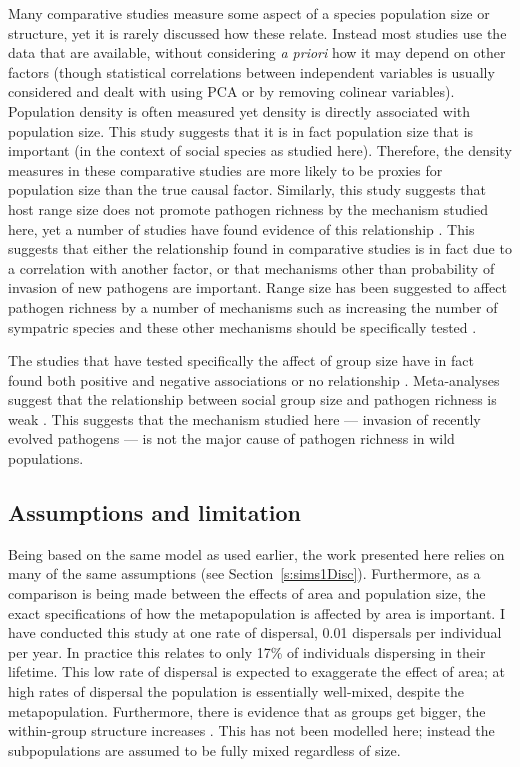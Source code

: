 Many comparative studies measure some aspect of a species population size or structure, yet it is rarely discussed how these relate.
Instead most studies use the data that are available, without considering \emph{a priori} how it may depend on other factors (though statistical correlations between independent variables is usually considered and dealt with using PCA or by removing colinear variables).
Population density is often measured \cite{morand1998density, lindenfors2007parasite, nunn2003comparative, arneberg2002host} yet density is directly associated with population size.
This study suggests that it is in fact population size that is important (in the context of social species as studied here).
Therefore, the density measures in these comparative studies are more likely to be proxies for population size than the true causal factor.
Similarly, this study suggests that host range size does not promote pathogen richness by the mechanism studied here, yet a number of studies have found evidence of this relationship \cite{kamiya2014determines, nunn2003comparative}.
This suggests that either the relationship found in comparative studies is in fact due to a correlation with another factor, or that mechanisms other than probability of invasion of new pathogens are important.
Range size has been suggested to affect pathogen richness by a number of mechanisms such as increasing the number of sympatric species and these other mechanisms should be specifically tested \cite{luis2013comparison}.

The studies that have tested specifically the affect of group size have in fact found both positive \cite{vitone2004body} and negative associations \cite{gay2014parasite} or no relationship \cite{ezenwa2006host}.
Meta-analyses suggest that the relationship between social group size and pathogen richness is weak \cite{rifkin2012animals}.
This suggests that the mechanism studied here --- invasion of recently evolved pathogens --- is not the major cause of pathogen richness in wild populations.



\subsection{Assumptions and limitation}

Being based on the same model as used earlier, the work presented here relies on many of the same assumptions (see Section~\ref{s:sims1Disc}).
Furthermore, as a comparison is being made between the effects of area and population size, the exact specifications of how the metapopulation is affected by area is important.
I have conducted this study at one rate of dispersal, 0.01 dispersals per individual per year.
In practice this relates to only 17\% of individuals dispersing in their lifetime.
This low rate of dispersal is expected to exaggerate the effect of area; at high rates of dispersal the population is essentially well-mixed, despite the metapopulation.
Furthermore, there is evidence that as groups get bigger, the within-group structure increases \cite{nunn2015infectious}.
This has not been modelled here; instead the subpopulations are assumed to be fully mixed regardless of size.

